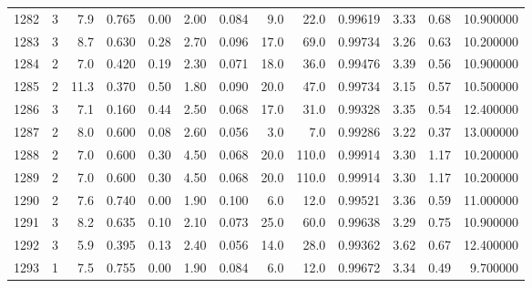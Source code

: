 \begin{tabular}{lrrrrrrrrrrrr}
1282 &        3 &            7.9 &             0.765 &         0.00 &            2.00 &      0.084 &                  9.0 &                  22.0 &  0.99619 &  3.33 &       0.68 &  10.900000 \\
1283 &        3 &            8.7 &             0.630 &         0.28 &            2.70 &      0.096 &                 17.0 &                  69.0 &  0.99734 &  3.26 &       0.63 &  10.200000 \\
1284 &        2 &            7.0 &             0.420 &         0.19 &            2.30 &      0.071 &                 18.0 &                  36.0 &  0.99476 &  3.39 &       0.56 &  10.900000 \\
1285 &        2 &           11.3 &             0.370 &         0.50 &            1.80 &      0.090 &                 20.0 &                  47.0 &  0.99734 &  3.15 &       0.57 &  10.500000 \\
1286 &        3 &            7.1 &             0.160 &         0.44 &            2.50 &      0.068 &                 17.0 &                  31.0 &  0.99328 &  3.35 &       0.54 &  12.400000 \\
1287 &        2 &            8.0 &             0.600 &         0.08 &            2.60 &      0.056 &                  3.0 &                   7.0 &  0.99286 &  3.22 &       0.37 &  13.000000 \\
1288 &        2 &            7.0 &             0.600 &         0.30 &            4.50 &      0.068 &                 20.0 &                 110.0 &  0.99914 &  3.30 &       1.17 &  10.200000 \\
1289 &        2 &            7.0 &             0.600 &         0.30 &            4.50 &      0.068 &                 20.0 &                 110.0 &  0.99914 &  3.30 &       1.17 &  10.200000 \\
1290 &        2 &            7.6 &             0.740 &         0.00 &            1.90 &      0.100 &                  6.0 &                  12.0 &  0.99521 &  3.36 &       0.59 &  11.000000 \\
1291 &        3 &            8.2 &             0.635 &         0.10 &            2.10 &      0.073 &                 25.0 &                  60.0 &  0.99638 &  3.29 &       0.75 &  10.900000 \\
1292 &        3 &            5.9 &             0.395 &         0.13 &            2.40 &      0.056 &                 14.0 &                  28.0 &  0.99362 &  3.62 &       0.67 &  12.400000 \\
1293 &        1 &            7.5 &             0.755 &         0.00 &            1.90 &      0.084 &                  6.0 &                  12.0 &  0.99672 &  3.34 &       0.49 &   9.700000 \\

\end{tabular}
